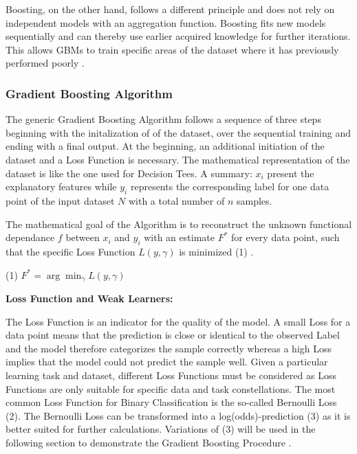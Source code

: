 Boosting, on the other hand, follows a different principle and does not rely on independent 
models with an aggregation function. Boosting fits new models sequentially and can thereby use 
earlier acquired knowledge for further iterations. This allows GBMs to train specific areas of 
the dataset where it has previously performed poorly \cite[p.345f]{James2021}.  

\subsubsection{Gradient Boosting Algorithm}
\label{sec:Gradient Boosting Algorithm}

The generic Gradient Boosting Algorithm follows a sequence of three steps beginning with the initalization of
of the dataset, over the sequential training and ending with a final output. At the beginning, an 
additional initiation of the dataset and a Loss Function is necessary. The mathematical 
representation of the dataset is like the one used for Decision Tees. A summary: \(x_{i}\) present the 
explanatory features while \(y_{i}\) represents the corresponding label for one data point of the input 
dataset \(N\) with a total number of \(n\) samples. 

The mathematical goal of the Algorithm is to reconstruct the unknown functional dependance \(f\) 
between \(x_{i}\) and \(y_{i}\) with an estimate \(F^{*}\) for every data point, such that the specific Loss 
Function \(L(y, \gamma)\) is minimized (1) \cite[p.1189]{Friedman_2001} \cite[2.1]{Natekin2013}. 

(1) \(F^{*} = \arg \min_{\gamma} L(y,\gamma)\)

\textbf{Loss Function and Weak Learners:}

The Loss Function is an indicator for the quality of the model. A small Loss for a data point 
means that the prediction is close or identical to the observed Label and the model therefore 
categorizes the sample correctly whereas a high Loss implies that the model could not predict 
the sample well. Given a particular learning task and dataset, different Loss Functions must 
be considered as Loss Functions are only suitable for specific data and task constellations. The most common 
Loss Function for Binary Classification is the so-called Bernoulli Loss (2). The Bernoulli Loss 
can be transformed into a log(odds)-prediction (3) as it is better suited for further calculations. 
Variations of (3) will be used in the following section to demonstrate the Gradient Boosting 
Procedure \cite[3.1]{Natekin2013}. 

